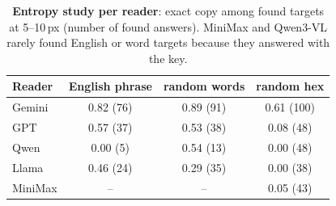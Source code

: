 \begin{table}[!htbp]
\centering
\caption{\textbf{Entropy study per reader}: exact copy among found targets at 5--10\,px (number of found answers). MiniMax and Qwen3-VL rarely found English or word targets because they answered with the key.}
\label{tab:app_esz_rd}
\footnotesize
\setlength{\tabcolsep}{3pt}
\begin{tabular}{l ccc}
\toprule
Reader & English phrase & random words & random hex \\
\midrule
Gemini & 0.82 (76) & 0.89 (91) & 0.61 (100) \\
GPT & 0.57 (37) & 0.53 (38) & 0.08 (48) \\
Qwen & 0.00 (5) & 0.54 (13) & 0.00 (48) \\
Llama & 0.46 (24) & 0.29 (35) & 0.00 (38) \\
MiniMax & -- & -- & 0.05 (43) \\
\bottomrule
\end{tabular}
\end{table}
